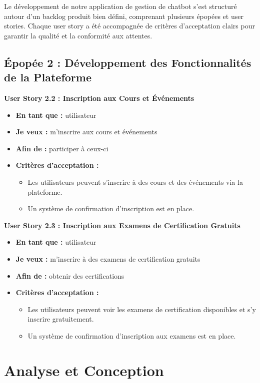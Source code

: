 \documentclass[a4paper, 11pt, openany]{report}
\begin{document}
Le développement de notre application de gestion de chatbot s’est structuré autour d’un backlog produit bien défini, comprenant plusieurs épopées et user stories. Chaque user story a été accompagnée de critères d’acceptation clairs pour garantir la qualité et la conformité aux attentes.

\subsection{Épopée 2 : Développement des Fonctionnalités de la Plateforme}

\textbf{User Story 2.2 : Inscription aux Cours et Événements}
\begin{itemize}
    \item \textbf{En tant que :} utilisateur
    \item \textbf{Je veux :} m'inscrire aux cours et événements
    \item \textbf{Afin de :} participer à ceux-ci
    \item \textbf{Critères d'acceptation :}
    \begin{itemize}
        \item Les utilisateurs peuvent s'inscrire à des cours et des événements via la plateforme.
        \item Un système de confirmation d'inscription est en place.
    \end{itemize}
\end{itemize}

\textbf{User Story 2.3 : Inscription aux Examens de Certification Gratuits}
\begin{itemize}
    \item \textbf{En tant que :} utilisateur
    \item \textbf{Je veux :} m'inscrire à des examens de certification gratuits
    \item \textbf{Afin de :} obtenir des certifications
    \item \textbf{Critères d'acceptation :}
    \begin{itemize}
        \item Les utilisateurs peuvent voir les examens de certification disponibles et s'y inscrire gratuitement.
        \item Un système de confirmation d'inscription aux examens est en place.
    \end{itemize}
\end{itemize}


\section{Analyse et Conception}
\end{document}
